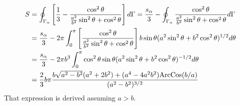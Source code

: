 \begin{align}
    S &= \oint_{\Gamma_{\alpha}} \left[
        \frac{1}{3} -  
        \frac{ \cos^2\theta}
        { \frac{a^2}{b^2}  \sin^2\theta 
    +    \cos^2\theta }
    \right]
     d\Gamma 
    =  
    \frac{s_\alpha}{3}
    -
    \oint_{\Gamma_{\alpha}} 
        \frac{ \cos^2\theta}
        { \frac{a^2}{b^2}  \sin^2\theta 
    +    \cos^2\theta }
     d\Gamma 
    \\
    &= 
    \frac{s_\alpha}{3}
    - 2\pi \int_0^\pi\left[
        \frac{ \cos^2\theta}
        { \frac{a^2}{b^2}  \sin^2\theta 
    +    \cos^2\theta }
    \right]
    b \sin\theta (a^2\sin^2\theta+ b^2 \cos^2\theta)^{1/2}d\theta \\
    &= 
    \frac{s_\alpha}{3}
    - 2\pi 
    b^3 
    \int_0^\pi
         \cos^2\theta
    \sin\theta (a^2\sin^2\theta+ b^2 \cos^2\theta)^{- 1/2}d\theta \\
    &= 
    \frac{2}{3}b\pi
    \frac{
            b \sqrt{a^2 - b^2}(a^2 + 2b^2)
            + (a^4  - 4 a^2 b^2)
            \text{ArcCos}(b/a)
    }{
    (a^2 - b^2)^{3/2}
    }
    \label{eq:S_solution}
\end{align}
That expression is derived assuming $a>b$. 



